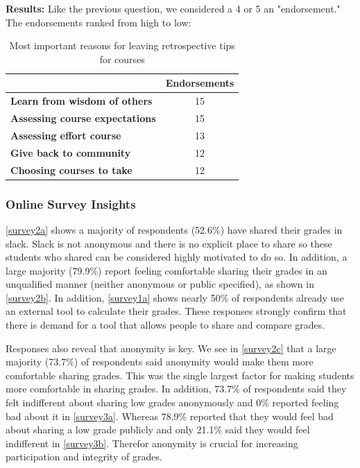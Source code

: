 \textbf{Results:} Like the previous question, we considered a 4 or 5 an "endorsement." The endorsements ranked from high to low:

\begin{table}[H]
\centering
\begin{tabular}{@{}lc@{}}
\toprule
                  & {\textbf{Endorsements}}  \\ \midrule
\textbf{Learn from wisdom of others}    & 15    \\
\textbf{Assessing course expectations}     & 15 \\
\textbf{Assessing effort course}     & 13 \\
\textbf{Give back to community}     & 12 \\
\textbf{Choosing courses to take}     & 12 \\ \bottomrule
\end{tabular}
\caption{Most important reasons for leaving retrospective tips for courses}
\label{survey5a}
\end{table}

\subsubsection{Online Survey Insights}
\cref{survey2a} shows a majority of respondents (52.6\%) have shared their grades in slack. Slack is not anonymous and there is no explicit place to share so these students who shared can be considered highly motivated to do so. In addition, a large majority (79.9\%) report feeling comfortable sharing their grades in an unqualified manner (neither anonymous or public specified), as shown in \cref{survey2b}. In addition, \cref{survey1a} shows nearly 50\% of respondents already use an external tool to calculate their grades. These responses strongly confirm that there is demand for a tool that allows people to share and compare grades.

Responses also reveal that anonymity is key. We see in \cref{survey2c} that a large majority (73.7\%) of respondents said anonymity would make them more comfortable sharing grades. This was the single largest factor for making students more comfortable in sharing grades. In addition, 73.7\% of respondents said they felt indifferent about sharing low grades anonymously and 0\% reported feeling bad about it in \cref{survey3a}. Whereas 78.9\% reported that they would feel bad about sharing a low grade publicly and only 21.1\% said they would feel indifferent in \cref{survey3b}. Therefor anonymity is crucial for increasing participation and integrity of grades.

